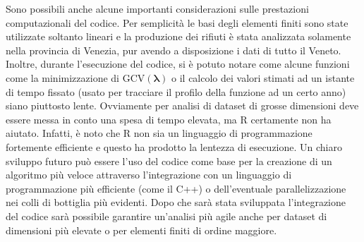 \documentclass[a4paper,11pt,twoside,openright]{book}							%
\begin{document}
Sono possibili anche alcune importanti considerazioni sulle prestazioni computazionali del codice. Per semplicità le basi degli elementi finiti sono state utilizzate soltanto lineari e la produzione dei rifiuti è stata analizzata solamente nella provincia di Venezia, pur avendo a disposizione i dati di tutto il Veneto. Inoltre, durante l'esecuzione del codice, si è potuto notare come alcune funzioni come la minimizzazione di $\mathrm{GCV}(\bm \lambda)$ o il calcolo dei valori stimati ad un istante di tempo fissato (usato per tracciare il profilo della funzione ad un certo anno) siano piuttosto lente. Ovviamente per analisi di dataset di grosse dimensioni deve essere messa in conto una spesa di tempo elevata, ma R certamente non ha aiutato. Infatti, è noto che R non sia un linguaggio di programmazione fortemente efficiente e questo ha prodotto la lentezza di esecuzione. Un chiaro sviluppo futuro può essere l'uso del codice come base per la creazione di un algoritmo più veloce attraverso l'integrazione con un linguaggio di programmazione più efficiente (come il C++) o dell'eventuale parallelizzazione nei colli di bottiglia più evidenti. Dopo che sarà stata sviluppata l'integrazione del codice sarà possibile garantire un'analisi più agile anche per dataset di dimensioni più elevate o per elementi finiti di ordine maggiore.
\end{document}
